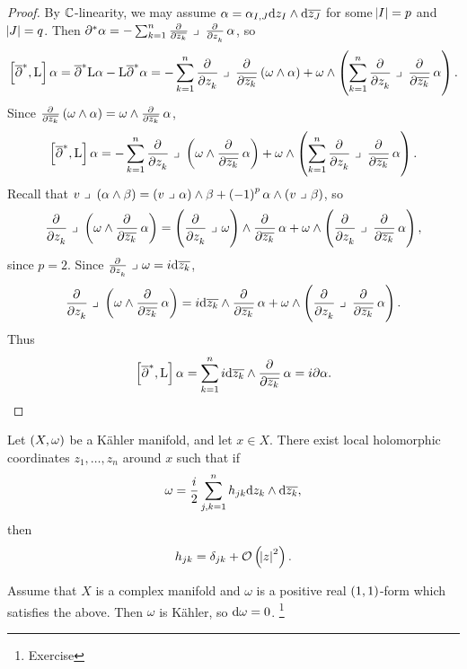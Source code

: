 \begin{proof}
By $ \mathbb{C} $-linearity, we may assume $ \alpha = \alpha_{I, J} \mathrm{d} z_I \wedge \mathrm{d}\overline{z_J} $ for some $ \abs{I} = p $ and $ \abs{J} = q $. Then $ \partial^*\alpha = -\sum_{k = 1}^n \tpd{}{\overline{z_k}} \ \lrcorner \ \tpd{}{z_k}\alpha $, so
$$ \sbr{\overline{\partial}^*, \L}\alpha = \overline{\partial}^*\L\alpha - \L\overline{\partial}^*\alpha = -\sum_{k = 1}^n \dpd{}{z_k} \ \lrcorner \ \dpd{}{\overline{z_k}}\br{\omega \wedge \alpha} + \omega \wedge \br{\sum_{k = 1}^n \dpd{}{z_k} \ \lrcorner \ \dpd{}{\overline{z_k}}\alpha}. $$
Since $ \tpd{}{\overline{z_k}}\br{\omega \wedge \alpha} = \omega \wedge \tpd{}{\overline{z_k}}\alpha $,
$$ \sbr{\overline{\partial}^*, \L}\alpha = -\sum_{k = 1}^n \dpd{}{z_k} \ \lrcorner \ \br{\omega \wedge \dpd{}{\overline{z_k}}\alpha} + \omega \wedge \br{\sum_{k = 1}^n \dpd{}{z_k} \ \lrcorner \ \dpd{}{\overline{z_k}}\alpha}. $$
Recall that $ v \ \lrcorner \ \br{\alpha \wedge \beta} = \br{v \ \lrcorner \ \alpha} \wedge \beta + \br{-1}^p\alpha \wedge \br{v \ \lrcorner \ \beta} $, so
$$ \dpd{}{z_k} \ \lrcorner \ \br{\omega \wedge \dpd{}{\overline{z_k}}\alpha} = \br{\dpd{}{z_k} \ \lrcorner \ \omega} \wedge \dpd{}{\overline{z_k}}\alpha + \omega \wedge \br{\dpd{}{z_k} \ \lrcorner \ \dpd{}{\overline{z_k}}\alpha}, $$
since $ p = 2 $. Since $ \tpd{}{z_k} \ \lrcorner \ \omega = i\d\overline{z_k} $,
$$ \dpd{}{z_k} \ \lrcorner \ \br{\omega \wedge \dpd{}{\overline{z_k}}\alpha} = i\d\overline{z_k} \wedge \dpd{}{\overline{z_k}}\alpha + \omega \wedge \br{\dpd{}{z_k} \ \lrcorner \ \dpd{}{\overline{z_k}}\alpha}. $$
Thus
$$ \sbr{\overline{\partial}^*, \L}\alpha = \sum_{k = 1}^n i\d\overline{z_k} \wedge \dpd{}{\overline{z_k}}\alpha = i\partial\alpha. $$
\end{proof}

\begin{theorem}
Let $ \br{X, \omega} $ be a K\"ahler manifold, and let $ x \in X $. There exist local holomorphic coordinates $ z_1, \dots, z_n $ around $ x $ such that if
$$ \omega = \dfrac{i}{2}\sum_{j, k = 1}^n h_{jk} \mathrm{d} z_k \wedge \mathrm{d}\overline{z_k}, $$
then
$$ h_{jk} = \delta_{jk} + \OOO\br{\abs{z}^2}. $$
\end{theorem}

\begin{remark*}
Assume that $ X $ is a complex manifold and $ \omega $ is a positive real $ \br{1, 1} $-form which satisfies the above. Then $ \omega $ is K\"ahler, so $ \mathrm{d}\omega = 0 $. \footnote{Exercise}
\end{remark*}

